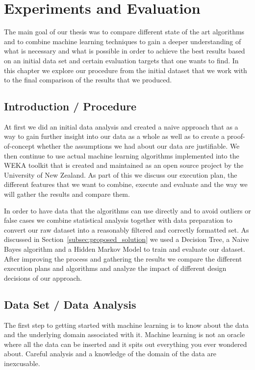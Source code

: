 \section{Experiments and Evaluation}
\label{sec:experiments}

The main goal of our thesis was to compare different state of the art algorithms and to combine machine learning techniques to gain a deeper understanding of what is necessary and what is possible in order to achieve the best results based on an initial data set and certain evaluation targets that one wants to find. In this chapter we explore our procedure from the initial dataset that we work with to the final comparison of the results that we produced.



\subsection{Introduction / Procedure}

At first we did an initial data analysis and created a naive approach that as a way to gain further insight into our data as a whole as well as to create a proof-of-concept whether the assumptions we had about our data are justifiable. 
We then continue to use actual machine learning algorithms implemented into the WEKA toolkit that is created and maintained as an open source project by the University of New Zealand. As part of this we discuss our execution plan, the different features that we want to combine, execute and evaluate and the way we will gather the results and compare them.

In order to have data that the algorithms can use directly and to avoid outliers or false cases we combine statistical analysis together with data preparation to convert our raw dataset into a reasonably filtered and correctly formatted set. As discussed in Section~\ref{subsec:proposed_solution} we used a Decision Tree, a Naive Bayes algorithm and a Hidden Markov Model to train and evaluate our dataset. After improving the process and gathering the results we compare the different execution plans and algorithms and analyze the impact of different design decisions of our approach.

\subsection{Data Set / Data Analysis}
\label{subsec:data_set}
The first step to getting started with machine learning is to know about the data and the underlying domain associated with it. Machine learning is not an oracle where all the data can be inserted and it spits out everything you ever wondered about. Careful analysis and a knowledge of the domain of the data are inexcusable. 

